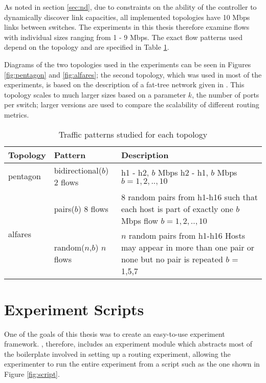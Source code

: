 As noted in section \ref{sec:nd}, due to constraints on the ability of the controller to dynamically discover link capacities, all implemented topologies have 10 Mbps links between switches. The experiments in this thesis therefore examine flows with individual sizes ranging from 1 - 9 Mbps. The exact flow patterns used depend on the topology and are specified in Table \ref{tab:patterns}. 

Diagrams of the two topologies used in the experiments can be seen in Figures \ref{fig:pentagon} and \ref{fig:alfares}; the second topology, which was used in most of the experiments, is based on the description of a fat-tree network given in \cite{alfares:fattree}. This topology scales to much larger sizes based on a parameter $k$, the number of ports per switch; larger versions are used to compare the scalability of different routing metrics.

\begin{table}
  \centering
  \begin{tabular}{p{3cm}p{4cm}p{5cm}}
    \toprule
    Topology & Pattern & Description \\
    \midrule
    pentagon & \parbox[t]{4cm}{bidirectional($b$) \\ 2 flows \strut} & \parbox[t]{5cm}{h1 - h2, $b$ Mbps \\ h2 - h1, $b$ Mbps \\ $b = 1,2,..,10$\strut} \\
    \midrule
     & \parbox[t]{4cm}{pairs($b$) \\ 8 flows\strut} & \parbox[t]{5cm}{8 random pairs from h1-h16 such that each host is part of exactly one $b$ Mbps flow \\ $b = 1,2,..,10$\strut} \\
    & \parbox[t]{4cm}{random($n$,$b$) \\ $n$ flows\strut} & \parbox[t]{5cm}{$n$ random pairs from h1-h16 Hosts may appear in more than one pair or none but no pair is repeated \\ $b$ = 1,5,7} \\
    \bottomrule
  \end{tabular}
  \caption{Traffic patterns studied for each topology}
  \label{tab:patterns}
\end{table}


\section{Experiment Scripts}
One of the goals of this thesis was to create an easy-to-use experiment framework. \thesis{}, therefore, includes an experiment module which abstracts most of the boilerplate involved in setting up a routing experiment, allowing the experimenter to run the entire experiment from a script such as the one shown in Figure \ref{fig:script}.


